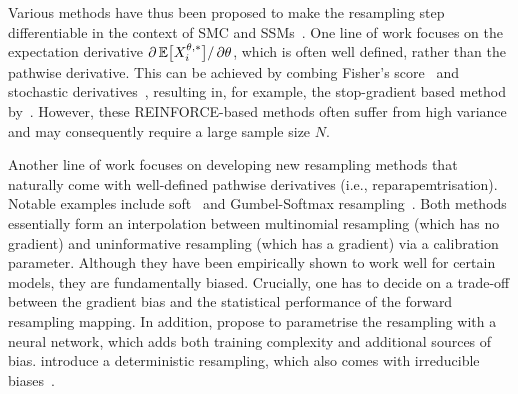 \documentclass{article}
\begin{document}
Various methods have thus been proposed to make the resampling step differentiable in the context of SMC and SSMs~\citep[see recent surveys in][]{Xiongjie2025, Brady2025pydpf}. 
One line of work focuses on the expectation derivative $\partial \operatorname{\mathbb{E}} \bigl[ X_i^{\theta, *} \bigr] / \, \partial \theta$, which is often well defined, rather than the pathwise derivative. 
This can be achieved by combing Fisher's score~\citep{Poyiadjis2011} and stochastic derivatives~\citep{Arya2022}, resulting in, for example, the stop-gradient based method by~\citet{Scibior2021differentiable}. 
However, these REINFORCE-based methods often suffer from high variance and may consequently require a large sample size $N$. 

Another line of work focuses on developing new resampling methods that naturally come with well-defined pathwise derivatives (i.e., reparapemtrisation). 
Notable examples include soft~\citep{Karkus2018} and Gumbel-Softmax resampling~\citep{Jang2017categorical}. 
Both methods essentially form an interpolation between multinomial resampling (which has no gradient) and uninformative resampling (which has a gradient) via a calibration parameter. 
Although they have been empirically shown to work well for certain models, they are fundamentally biased. 
Crucially, one has to decide on a trade-off between the gradient bias and the statistical performance of the forward resampling mapping. 
In addition, \citet{Zhu2020towards} propose to parametrise the resampling with a neural network, which adds both training complexity and additional sources of bias.
\citet{Kviman24a} introduce a deterministic resampling, which also comes with irreducible biases~\citep{Finke2026aistats}.
\end{document}
